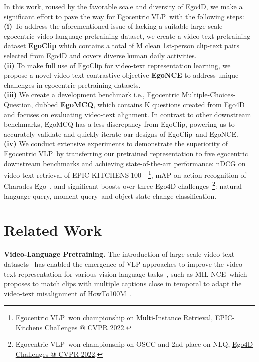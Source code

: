 \documentclass{article}
\newcommand{\vlp}{Egocentric VLP}
\newcommand{\dataset}{EgoClip}
\newcommand{\model}{EgoNCE\xspace}
\newcommand{\eval}{EgoMCQ}
\newcommand{\epic}{EPIC-KITCHENS-100}
\newcommand{\howto}{HowTo100M}
\begin{document}
In this work, roused by the favorable scale and diversity of Ego4D, we make a significant effort to pave the way for \vlp~with the following steps:\\
\textbf{(i)} To address the aforementioned issue of lacking a suitable large-scale egocentric video-language pretraining dataset, we create a video-text pretraining dataset \textbf{\dataset} which contains a total of M clean 1st-person clip-text pairs selected from Ego4D and covers diverse human daily activities.\\
\textbf{(ii)} To make full use of {\dataset} for video-text representation learning, we propose a novel video-text contrastive objective \textbf{\model} to address unique challenges in egocentric pretraining datasets.\\
\textbf{(iii)} We create a development benchmark i.e., Egocentric Multiple-Choices-Question, dubbed \textbf{\eval}, which contains K questions created from Ego4D and focuses on evaluating video-text alignment. In contrast to other downstream benchmarks, {\eval} has a less discrepancy from \dataset, powering us to accurately validate and quickly iterate our designs of \dataset~and \model.\\
\textbf{(iv)} We conduct extensive experiments to demonstrate the superiority of \vlp~by transferring our pretrained representation to five egocentric downstream benchmarks and achieving state-of-the-art performance:  nDCG on video-text retrieval of \epic~\cite{kazakos2019epic}~\footnote{\footnotesize \vlp~won championship on Multi-Instance Retrieval, \href{https://epic-kitchens.github.io/2022}{EPIC-Kitchens Challenges @ CVPR 2022}.},  mAP on action recognition of Charades-Ego~\cite{sigurdsson2018charades}, and significant boosts over three Ego4D challenges~\footnote{\footnotesize \vlp~won championship on OSCC and 2nd place on NLQ, \href{https://ego4d-data.org/workshops/cvpr22/}{Ego4D Challenges @ CVPR 2022}.}: natural language query, moment query~and object state change classification. \section{Related Work}
\noindent\textbf{Video-Language Pretraining.}\label{relatedwork_vlp}
The introduction of large-scale video-text datasets~\cite{miech2019howto100m,bain2021frozen} has enabled the emergence of VLP approaches to improve the video-text representation for various vision-language tasks~\cite{anne2017localizing, chen2017sca, msrvttqamsvdqa}, such as MIL-NCE~which \cite{miech2020end} proposes to match clips with multiple captions close in temporal to adapt the video-text misalignment of \howto~\cite{miech2019howto100m}.
\end{document}
